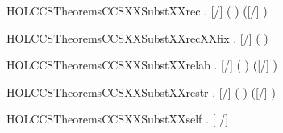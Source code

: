 \newcommand{\HOLCCSTheoremsCCSXXSubstXXprefix}{\UseVerbatim{HOLCCSTheoremsCCSXXSubstXXprefix}}
\begin{SaveVerbatim}{HOLCCSTheoremsCCSXXSubstXXrec}
\HOLTokenTurnstile{} \HOLSymConst{\HOLTokenForall{}}   .
       [/] (  ) \HOLSymConst{=}
         \HOLSymConst{=}         ([/] )
\end{SaveVerbatim}
\newcommand{\HOLCCSTheoremsCCSXXSubstXXrec}{\UseVerbatim{HOLCCSTheoremsCCSXXSubstXXrec}}
\begin{SaveVerbatim}{HOLCCSTheoremsCCSXXSubstXXrecXXfix}
\HOLTokenTurnstile{} \HOLSymConst{\HOLTokenForall{}}  . [/] (  ) \HOLSymConst{=}   
\end{SaveVerbatim}
\newcommand{\HOLCCSTheoremsCCSXXSubstXXrecXXfix}{\UseVerbatim{HOLCCSTheoremsCCSXXSubstXXrecXXfix}}
\begin{SaveVerbatim}{HOLCCSTheoremsCCSXXSubstXXrelab}
\HOLTokenTurnstile{} \HOLSymConst{\HOLTokenForall{}}   . [/] (  ) \HOLSymConst{=}  ([/] ) 
\end{SaveVerbatim}
\newcommand{\HOLCCSTheoremsCCSXXSubstXXrelab}{\UseVerbatim{HOLCCSTheoremsCCSXXSubstXXrelab}}
\begin{SaveVerbatim}{HOLCCSTheoremsCCSXXSubstXXrestr}
\HOLTokenTurnstile{} \HOLSymConst{\HOLTokenForall{}}   . [/] (\HOLConst{\ensuremath{\nu}}  ) \HOLSymConst{=} \HOLConst{\ensuremath{\nu}}  ([/] )
\end{SaveVerbatim}
\newcommand{\HOLCCSTheoremsCCSXXSubstXXrestr}{\UseVerbatim{HOLCCSTheoremsCCSXXSubstXXrestr}}
\begin{SaveVerbatim}{HOLCCSTheoremsCCSXXSubstXXself}
\HOLTokenTurnstile{} \HOLSymConst{\HOLTokenForall{}} . [ /]  \HOLSymConst{=} 
\end{SaveVerbatim}
